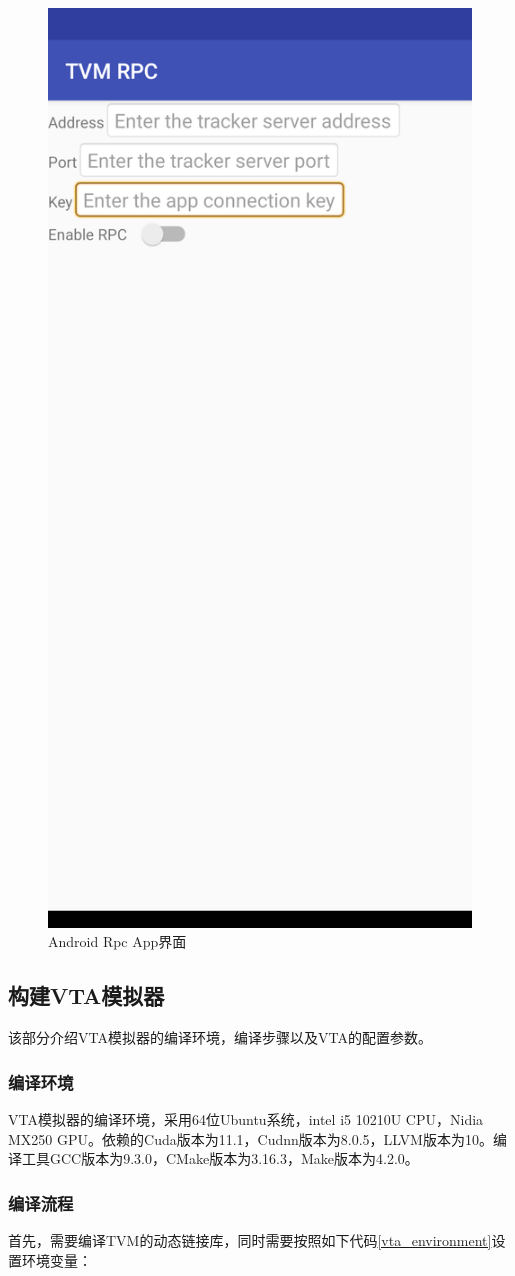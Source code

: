 \begin{figure}[h!]
    \centering
    \includegraphics[width=180.bp]{figure/android_app.png}
    \caption{Android Rpc App界面}
    \label{android_rpc_app}
\end{figure}


\subsection{构建VTA模拟器}
该部分介绍VTA模拟器的编译环境，编译步骤以及VTA的配置参数。

\subsubsection{编译环境}

VTA模拟器的编译环境，采用64位Ubuntu系统，intel i5 10210U CPU，Nidia MX250 GPU。依赖的Cuda版本为11.1，Cudnn版本为8.0.5，LLVM版本为10。编译工具GCC版本为9.3.0，CMake版本为3.16.3，Make版本为4.2.0。

\subsubsection{编译流程}

首先，需要编译TVM的动态链接库，同时需要按照如下代码\ref{vta_environment}设置环境变量：

